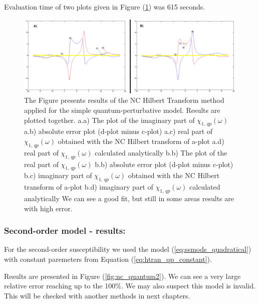 \documentclass[12pt,twoside,a4paper]{article}
\numberwithin{equation}{subsection}
\numberwithin{figure}{subsection}
\begin{document}
Evaluation time of two plots given in Figure (\ref{fig:nc_qp1}) was 615 seconds.

\begin{figure}
  \includegraphics[width=150mm]{img/nc_qp1.png}
  \caption{ The Figure presents results of the NC Hilbert Transform method applied for the simple quantum-perturbative model. Results are plotted together. 
    a.a) The plot of the imaginary part of ${\chi_{1, \, qp}}(\omega )$
    a.b) absolute error plot (d-plot minus c-plot) 
    a.c) real part of ${\chi_{1, \, qp}}(\omega )$ obtained with the NC Hilbert transform of a-plot 
    a.d) real part of ${\chi_{1, \, qp}}(\omega )$ calculated analytically 
    b.b) The plot of the real part of ${\chi_{1, \, qp}}(\omega )$ 
    b.b) absolute error plot (d-plot minus c-plot) 
    b.c) imaginary part of ${\chi_{1, \, qp}}(\omega )$ obtained with the NC Hilbert transform of a-plot 
    b.d) imaginary part of ${\chi_{1, \, qp}}(\omega )$ calculated analytically
    We can see a good fit, but still in some areas results are with high error.  
    \label{fig:nc_qp1}
  }
\end{figure}

\subsubsection*{Second-order model - results:}

For the second-order susceptibility we used the model  (\ref{eq:ssmods_quadratical}) with constant paremeters from Equation (\ref{eq:htran_qp_constant}).

Results are presented in Figure (\ref{fig:nc_quantum2}). We can see a very large relative error reaching up to the 100\%. We may also suspect this model is invalid. This will be checked with another methods in next chapters.
\end{document}
